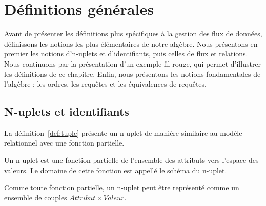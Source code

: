 \section{Définitions générales}\label{sec:contrib:astral:definitions}
Avant de présenter les définitions plus spécifiques à la gestion des flux de données, définissons les notions les plus élémentaires de notre algèbre. Nous présentons en premier les notions d'n-uplets et d'identifiants, puis celles de flux et relations. Nous continuons par la présentation d'un exemple fil rouge, qui permet d'illustrer les définitions de ce chapitre. Enfin, nous présentons les notions fondamentales de l'algèbre : les ordres, les requêtes et les équivalences de requêtes.

\subsection{N-uplets et identifiants}
La définition~\ref{def:tuple} présente un n-uplet de manière similaire au modèle relationnel avec une fonction partielle.
\begin{defi}[n-uplet]\label{def:tuple}
    Un n-uplet est une fonction partielle de l'ensemble des attributs vers l'espace des valeurs. Le domaine de cette fonction est appellé le schéma du n-uplet.
    
    Comme toute fonction partielle, un n-uplet peut être représenté comme un ensemble de couples $Attribut\times Valeur$.
\end{defi}


